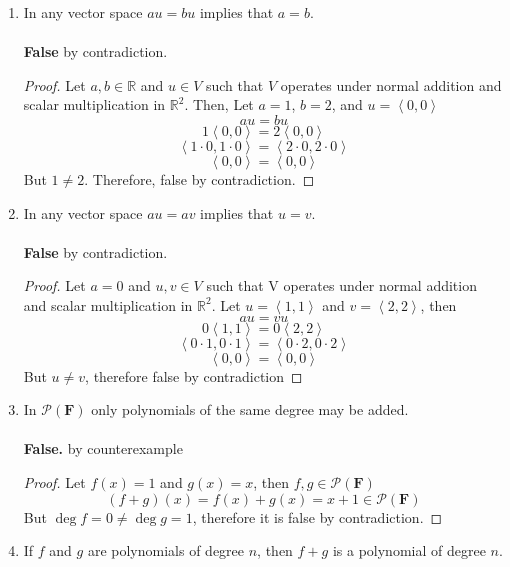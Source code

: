 \documentclass[12pt]{article}
\newcommand{\pf}{\mathcal{P}(\mathbf{F})}
\newcommand{\R}{\mathbb{R}}
\renewcommand{\vector}[1]{\left\langle{#1}\right\rangle}
\begin{document}
\begin{enumerate}
\begin{enumerate}
        \item In any vector space $au=bu$ implies that $a=b$.
        \\\\\textbf{False} by contradiction.
        \begin{proof} Let $a, b \in \R$ and $u \in V$ such that $V$ operates under normal addition and scalar multiplication in $\R^2$. Then,
        Let $a = 1$, $b = 2$, and $u = \vector{0,0}$
            $$au = bu$$ %
            $$1 \vector{0,0}  = 2 \vector{0,0} $$
            $$\vector{1 \cdot 0, 1 \cdot 0} = \vector{2 \cdot 0, 2 \cdot 0}$$
            $$\vector{0,0} = \vector{0,0}$$
            But $1 \not = 2$. Therefore, false by contradiction.
        \end{proof}\vspace{.4in}
        \item In any vector space $au=av$ implies that $u=v$.
        \\\\\textbf{False} by contradiction.
        \begin{proof}
            Let $a = 0$ and $u, v \in V$ such that V operates under normal addition and scalar multiplication in $\R^2$. Let $u = \vector{1,1}$ and $v = \vector{2, 2}$, then
            $$au = vu$$
            $$0 \vector{1,1} = 0 \vector{2,2}$$
            $$\vector{0 \cdot 1, 0 \cdot 1} = \vector{0 \cdot 2, 0 \cdot 2}$$
            $$\vector{0,0} = \vector{0,0}$$
            But $u \not = v$, therefore false by contradiction
        \end{proof}\vspace{.4in}
        \item In $\mathcal{P}(\mathbf{F})$ only polynomials of the same degree may be added.\\\\
        \textbf{False.} by counterexample
            \begin{proof}
                    Let $f(x) = 1$ and $g(x) = x$, then $f, g \in \pf$
                    $$(f+g)(x) = f(x) + g(x) = x + 1 \in \pf$$
                    But $\deg{f} = 0 \not = \deg{g} = 1$, therefore it is false by contradiction.
            \end{proof}\vspace{.4in}
        \item If $f$ and $g$ are polynomials of degree $n$, then $f+g$ is a polynomial of degree $n$.\\\\

\end{enumerate}
\end{enumerate}
\end{document}
